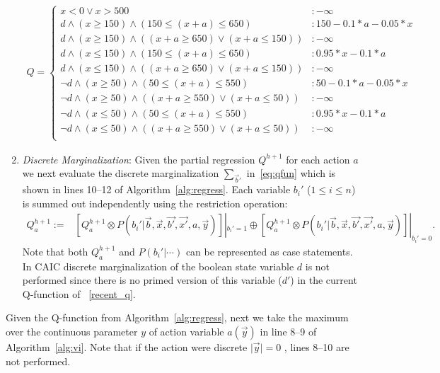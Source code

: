 \documentclass[twoside,11pt]{article}
\begin{document}
\begin{enumerate}
{\footnotesize
\begin{align}
Q = \begin{cases}
x < 0 \vee x>500 &: -\infty \\
d \land (x \geq 150) \land (150 \leq (x+a) \leq 650) &:  150 - 0.1 * a - 0.05 * x \\
d \land (x \geq 150) \land ((x+a \geq 650) \vee (x+a \leq 150)) &:  -\infty \\
d \land (x \leq 150) \land (150 \leq (x+a) \leq 650)&:  0.95 * x - 0.1 * a \\
d \land (x \leq 150) \land ((x+a \geq 650) \vee (x+a \leq 150)) &:  -\infty \\
\neg d \land (x \geq 50) \land (50 \leq (x+a) \leq 550)  &:  50 - 0.1 * a - 0.05 * x \\
\neg d \land (x \geq 50) \land ((x+a \geq 550) \vee (x+a \leq 50)) &:  -\infty \\
\neg d \land (x \leq 50) \land (50 \leq (x+a) \leq 550) &:  0.95 * x - 0.1 * a \\
\neg d \land (x \leq 50) \land ((x+a \geq 550) \vee (x+a \leq 50)) &:  -\infty \\
\end{cases} \label{recent_q}
\end{align}
}

\item {\it Discrete Marginalization}: Given the partial
regression $Q^{h+1}$ for each action $a$ we next evaluate the discrete 
marginalization $\sum_{\vec{b}'}$ in~\eqref{eq:qfun} which is shown in lines 10--12 of Algorithm~\ref{alg:regress}.
Each variable $b_i'$ ($1 \leq i \leq n$)  is summed out independently using the restriction operation:
\begin{align*}
Q_a^{h+1} := & \left[ Q_a^{h+1} \otimes \mathit{P}(b_i'|\vec{b},\vec{x},\vec{b'},\vec{x'},a,\vec{y}) \right]|_{b_i' = 1} 
 \oplus \left[ Q_a^{h+1} \otimes \mathit{P}(b_i'|\vec{b},\vec{x},\vec{b'},\vec{x'},a,\vec{y}) \right]|_{b_i' = 0}.
\end{align*}
Note that both $Q_a^{h+1}$ and $\mathit{P}(b_i'|\cdots)$ can be represented
as case statements.
In \textsc{CAIC} discrete marginalization of the boolean state variable $d$ is not performed since there is no primed version of this variable ($d'$) in the current Q-function of ~\eqref{recent_q}. 
\end{enumerate}

Given the Q-function from Algorithm~\ref{alg:regress}, next we take the maximum over the continuous parameter $y$ of action variable $a(\vec{y})$ in line 8--9 of Algorithm~\ref{alg:vi}. Note that if the action were discrete $\mid \vec{y} \mid=0$ , lines 8--10 are not performed.
\end{document}
